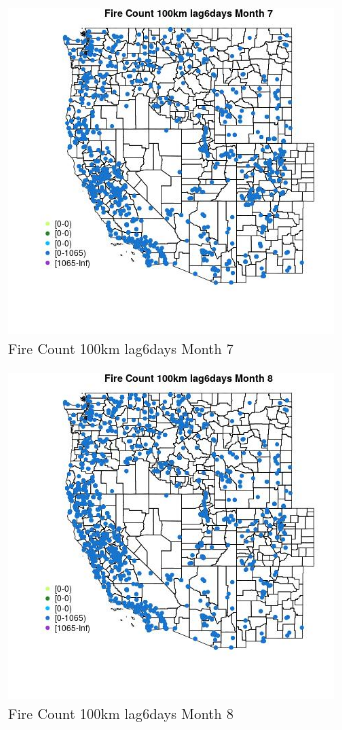 \begin{figure} 
\centering  
\includegraphics[width=0.77\textwidth]{Code_Outputs/Report_ML_input_PM25_Step4_part_f_de_duplicated_aves_prioritize_24hr_obswNAs_MapObsMo7Fire_Count_100km_lag6days.jpg} 
\caption{\label{fig:Report_ML_input_PM25_Step4_part_f_de_duplicated_aves_prioritize_24hr_obswNAsMapObsMo7Fire_Count_100km_lag6days}Fire Count 100km lag6days Month 7} 
\end{figure} 
 

\begin{figure} 
\centering  
\includegraphics[width=0.77\textwidth]{Code_Outputs/Report_ML_input_PM25_Step4_part_f_de_duplicated_aves_prioritize_24hr_obswNAs_MapObsMo8Fire_Count_100km_lag6days.jpg} 
\caption{\label{fig:Report_ML_input_PM25_Step4_part_f_de_duplicated_aves_prioritize_24hr_obswNAsMapObsMo8Fire_Count_100km_lag6days}Fire Count 100km lag6days Month 8} 
\end{figure} 
 

